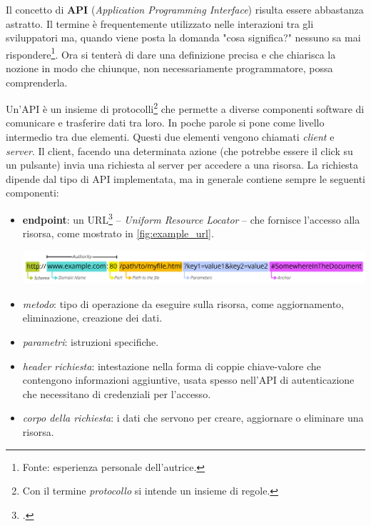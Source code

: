 \documentclass[./main.tex]{subfiles}
\begin{document}
Il concetto di \textbf{API} (\textit{Application Programming Interface})  risulta essere abbastanza astratto. Il termine è frequentemente utilizzato nelle interazioni tra gli sviluppatori ma, quando viene posta la domanda "cosa significa?" nessuno sa mai rispondere\footnote{Fonte: esperienza personale dell'autrice.}. Ora si tenterà di dare una definizione precisa e che chiarisca la nozione in modo che chiunque, non necessariamente programmatore, possa comprenderla.\par

Un'API è un insieme di protocolli\footnote{Con il termine \textit{protocollo} si intende un insieme di regole.} che permette a diverse componenti software di comunicare e trasferire dati tra loro. In poche parole si pone come livello intermedio tra due elementi. Questi due elementi vengono chiamati \textit{client} e \textit{server}. Il client, facendo una determinata azione (che potrebbe essere il click su un pulsante) invia una richiesta al server per accedere a una risorsa. La richiesta dipende dal tipo di API implementata, ma in generale contiene sempre le seguenti componenti:

\begin{itemize}
    \item \textbf{endpoint}: un URL\footcite[\url{https://developer.mozilla.org/en-US/docs/Learn/Common_questions/Web_mechanics/What_is_a_URL}]{website-mozilla-dev} -- \textit{Uniform Resource Locator} -- che fornisce l'accesso alla risorsa, come mostrato in \autoref{fig:example_url}.
    
    \begin{minipage}{0.925\textwidth}
    \includegraphics[width=\textwidth]{images/example_of_url.pdf}
    \captionsetup{font=small, hypcap=false}
    \label{fig:example_url}
    \end{minipage}
    \vspace{0.25cm}
    
    \item \textit{metodo}: tipo di operazione da eseguire sulla risorsa, come aggiornamento, eliminazione, creazione dei dati.
    \item \textit{parametri}: istruzioni specifiche.
    \item \textit{header richiesta}: intestazione nella forma di coppie chiave-valore che contengono informazioni aggiuntive, usata spesso nell'API di autenticazione che necessitano di credenziali per l'accesso.
    \item \textit{corpo della richiesta}: i dati che servono per creare, aggiornare o eliminare una risorsa.
\end{itemize}
\end{document}
